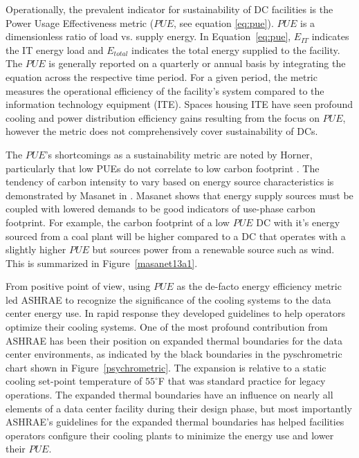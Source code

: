     
    
    Operationally, the prevalent indicator for sustainability of DC facilities is the Power Usage Effectiveness metric ($PUE$, see equation \ref{eq:pue}). $PUE$ is a dimensionless ratio of load vs. supply energy.  In Equation~\ref{eq:pue}, $E_{IT}$ indicates the IT energy load and $E_{total}$ indicates the total energy supplied to the facility. The $PUE$ is generally reported on a quarterly or annual basis by integrating the equation across the respective time period. For a given period, the metric measures the operational efficiency of the facility's system compared to the information technology equipment (ITE). Spaces housing ITE have seen profound cooling and power distribution efficiency gains resulting from the focus on $PUE$, however the metric does not comprehensively cover sustainability of DCs.
    
    
    
    The $PUE$'s shortcomings as a sustainability metric are noted by Horner, particularly that low PUEs do not correlate to low carbon footprint \cite{Horner16a}. The tendency of carbon intensity to vary based on energy source characteristics is demonstrated by Masanet in \cite{Masanet13a}. Masanet shows that energy supply sources must be coupled with lowered demands to be good indicators of use-phase carbon footprint. For example, the carbon footprint of a low $PUE$ DC with it's energy sourced from a coal plant will be higher compared to a DC that operates with a slightly higher $PUE$ but sources power from a renewable source such as wind. This is summarized in Figure~\ref{masanet13a1}.
    
    
    
   From positive point of view, using $PUE$ as the de-facto energy efficiency metric led ASHRAE to recognize the significance of the cooling systems to the data center energy use. In rapid response they developed guidelines to help operators optimize their cooling systems. One of the most profound contribution from ASHRAE has been their position on expanded thermal boundaries for the data center environments, as indicated by the black boundaries in the pyschrometric chart shown in Figure~\ref{psychrometric}. The expansion is relative to a static cooling set-point temperature of $55^{\circ}$F that was standard practice for legacy operations. The expanded thermal boundaries have an influence on nearly all elements of a data center facility during their design phase, but most importantly ASHRAE's guidelines for the expanded thermal boundaries has helped facilities operators configure their cooling plants to minimize the energy use and lower their $PUE$.
    
